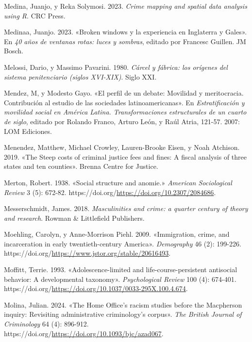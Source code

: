 \documentclass[
  spanish,
  letterpaper,
  DIV=11,
  numbers=noendperiod]{scrreprt}
\newlength{\cslhangindent}
\newenvironment{CSLReferences}[2] %
 {\begin{list}{}{%
  \setlength{\itemindent}{0pt}
  \setlength{\leftmargin}{0pt}
  \setlength{\parsep}{0pt}
  \ifodd #1
   \setlength{\leftmargin}{\cslhangindent}
   \setlength{\itemindent}{-1\cslhangindent}
  \fi
  \setlength{\itemsep}{#2\baselineskip}}}
 {\end{list}}
\begin{document}
\begin{CSLReferences}{1}{0}
Medina, Juanjo, y Reka Solymosi. 2023. \emph{Crime mapping and spatial
data analysis using R}. CRC Press.

Medinaa, Juanjo. 2023. {«Broken windows y la experiencia en Inglaterra y
Gales»}. En \emph{40 años de ventanas rotas: luces y sombras}, editado
por Francesc Guillen. JM Bosch.

Melossi, Dario, y Massimo Pavarini. 1980. \emph{Cárcel y fábrica: los
orígenes del sistema penitenciario (siglos XVI-XIX)}. Siglo XXI.

Mendez, M, y Modesto Gayo. {«El perfil de un debate: Movilidad y
meritocracia. Contribución al estudio de las sociedades
latinoamericanas»}. En \emph{Estratificación y movilidad social en
América Latina. Transformaciones estructurales de un cuarto de siglo},
editado por Rolando Franco, Arturo León, y Raúl Atria, 121-57. 2007: LOM
Ediciones.

Menendez, Matthew, Michael Crowley, Lauren-Brooke Eisen, y Noah
Atchison. 2019. {«The Steep costs of criminal justice fees and fines: A
fiscal analysis of three states and ten counties»}. Brenna Centre for
Justice.

Merton, Robert. 1938. {«Social structure and anomie.»} \emph{American
Sociological Review} 3 (5): 672-82.
https://doi.org/\url{https://doi.org/10.2307/2084686}.

Messerschmidt, James. 2018. \emph{Masculinities and crime: a quarter
century of theory and research}. Rowman \& Littlefield Publishers.

Moehling, Carolyn, y Anne-Morrison Piehl. 2009. {«Immigration, crime,
and incarceration in early twentieth-century America»}.
\emph{Demography} 46 (2): 199-226.
https://doi.org/\url{https://www.jstor.org/stable/20616493}.

Moffitt, Terrie. 1993. {«Adolescence-limited and life-course-persistent
antisocial behavior: A developmental taxonomy»}. \emph{Psychological
Review} 100 (4): 674-401.
https://doi.org/\url{https://doi.org/10.1037/0033-295X.100.4.674}.

Molina, Julian. 2024. {«The Home Office's racism studies before the
Macpherson inquiry: Revisiting administrative criminology's corpus»}.
\emph{The British Journal of Criminology} 64 (4): 896-912.
https://doi.org/\url{https://doi.org/10.1093/bjc/azad067}.


\end{CSLReferences}
\end{document}
